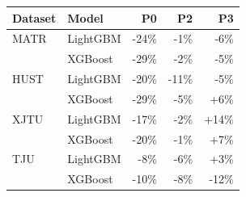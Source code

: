 \begin{tabular}{llrrr}
\toprule
Dataset & Model & P0 & P2 & P3 \\
\midrule
MATR & LightGBM & -24\% & -1\% & -6\% \\
 & XGBoost & -29\% & -2\% & -5\% \\
HUST & LightGBM & -20\% & -11\% & -5\% \\
 & XGBoost & -29\% & -5\% & +6\% \\
XJTU & LightGBM & -17\% & -2\% & +14\% \\
 & XGBoost & -20\% & -1\% & +7\% \\
TJU & LightGBM & -8\% & -6\% & +3\% \\
 & XGBoost & -10\% & -8\% & -12\% \\
\bottomrule
\end{tabular}

